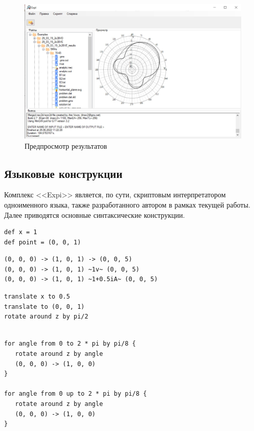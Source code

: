 \begin{figure}[h!]
  \centering
  \includegraphics[width=\linewidth]{expi_results.jpeg}
  \caption{Предпросмотр результатов}
  \label{ic:applic_b_results}
\end{figure}

\subsection{Языковые конструкции}
Комплекс <<Expi>> является, по сути, скриптовым интерпретатором одноименного языка, также разработанного автором в рамках текущей работы. Далее приводятся основные синтаксические конструкции.

\begin{lstlisting}[caption={Переменные}, label={experiment}]
def x = 1
def point = (0, 0, 1)
\end{lstlisting}

\begin{lstlisting}[caption={Сегментированный провод}, label={experiment}]
(0, 0, 0) -> (1, 0, 1) -> (0, 0, 5)
(0, 0, 0) -> (1, 0, 1) ~1v~ (0, 0, 5)
(0, 0, 0) -> (1, 0, 1) ~1+0.5iA~ (0, 0, 5)
\end{lstlisting}

\begin{lstlisting}[caption={Линейные преобразования}, label={experiment}]
translate x to 0.5
translate to (0, 0, 1)
rotate around z by pi/2
\end{lstlisting}

\begin{lstlisting}[caption={Циклы}, label={experiment}]

for angle from 0 to 2 * pi by pi/8 {
   rotate around z by angle
   (0, 0, 0) -> (1, 0, 0)
}

for angle from 0 up to 2 * pi by pi/8 {
   rotate around z by angle
   (0, 0, 0) -> (1, 0, 0)
}

\end{lstlisting}


